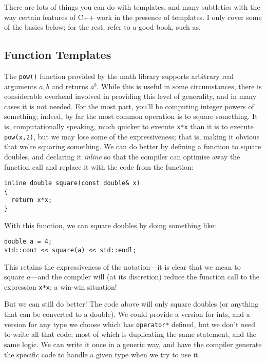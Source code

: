 \documentclass[a4paper]{scrartcl}
\begin{document}
There are lots of things you can do with templates, and many subtleties with the way certain features of C++ work in the presence of templates. I only cover some of the basics below; for the rest, refer to a good book, such as\cite{Templates}.

\subsection{Function Templates}\label{sec:templates_functions}
The \verb|pow()| function provided by the math library supports arbitrary real arguments $a,b$ and returns $a^b$. While this is useful in some circumstances, there is considerable overhead involved in providing this level of generality, and in many cases it is not needed. For the most part, you'll be computing integer powers of something; indeed, by far the most common operation is to square something. It is, computationally speaking, much quicker to execute \verb|x*x| than it is to execute \verb|pow(x,2)|, but we may lose some of the expressiveness; that is, making it obvious that we're squaring something. We can do better by defining a function to square doubles, and declaring it \emph{inline} so that the compiler can optimise away the function call and replace it with the code from the function:

\begin{verbatim}
inline double square(const double& x)
{
  return x*x;
}
\end{verbatim}

With this function, we can square doubles by doing something like:
\begin{verbatim}
double a = 4;
std::cout << square(a) << std::endl;
\end{verbatim}

This retains the expressiveness of the notation---it is clear that we mean to square $a$---and the compiler will (at its discretion) reduce the function call to the expression \verb|x*x|; a win-win situation!

But we can still do better! The code above will only square doubles (or anything that can be converted to a double). We could provide a version for ints, and a version for any type we choose which has \verb|operator*| defined, but we don't need to write all that code; most of which is duplicating the same statement, and the same logic. We can write it once in a generic way, and have the compiler generate the specific code to handle a given type when we try to use it.
\end{document}
